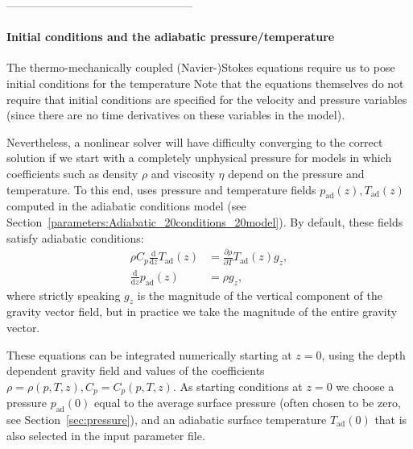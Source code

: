 --------------------------------------------------

\paragraph{Initial conditions and the adiabatic pressure/temperature}

The thermo-mechanically coupled (Navier-)Stokes 
equations require us to
pose initial conditions for the temperature
Note that the equations
themselves do not require that initial conditions are specified for
the velocity and pressure variables (since there are no time
derivatives on these variables in the model).

Nevertheless, a nonlinear solver will have difficulty converging to
the correct solution if we start with a completely unphysical pressure
for models in which coefficients such as density $\rho$ and viscosity
$\eta$ depend on the pressure and temperature. To this end, \aspect{}
uses pressure and temperature fields $p_{\textrm{ad}}(z),
T_{\textrm{ad}}(z)$ computed in the adiabatic conditions model
(see Section~\ref{parameters:Adiabatic_20conditions_20model}).
By default, these fields satisfy adiabatic conditions:
\begin{align}
\rho C_p \frac{\textrm{d}}{\textrm{d}z} T_{\textrm{ad}}(z)
&=
\frac{\partial\rho}{\partial T} T_{\textrm{ad}}(z) g_z,
\\
\frac{\textrm{d}}{\textrm{d}z} p_{\textrm{ad}}(z)
&=
\rho g_z,
\end{align}
where strictly speaking $g_z$ is the magnitude of the vertical
component of the gravity vector field, but in practice we take the
magnitude of the entire gravity vector.

These equations can be integrated numerically starting at $z=0$, using
the depth dependent gravity field and values of the coefficients
$\rho=\rho(p,T,z), C_p=C_p(p,T,z)$. As starting conditions at $z=0$ we
choose a pressure $p_{\textrm{ad}}(0)$ equal to the average surface
pressure (often chosen to be zero, see Section~\ref{sec:pressure}),
and an adiabatic surface temperature $T_{\textrm{ad}}(0)$ that is
also selected in the input parameter file.


